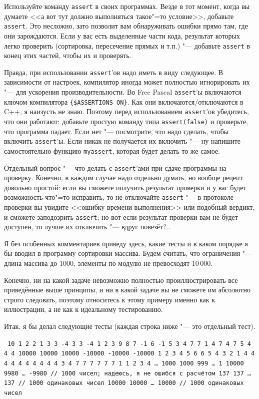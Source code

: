 \documentclass[a4paper,10pt]{problems}
\begin{document}
Используйте команду \verb`assert` в своих программах. 
Везде в тот момент, когда вы думаете <<а вот тут должно выполняться такое"=то условие>>, добавьте \verb`assert`. 
Это несложно, зато позволит вам обнаруживать ошибки прямо там, где они зарождаются. 
Если у вас есть выделенные части кода, результат которых легко проверить (сортировка, пересечение прямых и т.п.) "---
добавьте \verb`assert` в конец этих частей, чтобы их и проверять.

Правда, при использовании \verb`assert`'ов надо иметь в виду следующее.
В зависимости от настроек, компилятор иногда может полностью игнорировать их "--- для ускорения производительности.
Во Free Pascal \verb`assert`'ы включаются ключом компилятора \verb`{$ASSERTIONS ON}`. 
Как они включаются/отключаются в C++, я наизусть не знаю.
Поэтому перед использованием \verb`assert`'ов убедитесь, что они работают: добавьте простую команду типа \verb`assert(false)` и проверьте,
что программа падает. 
Если нет "--- посмотрите, что надо сделать, чтобы включить \verb`assert`'ы. 
Если никак не получается их включить "--- ну напишите самостоятельно функцию \verb`myassert`, которая будет делать то же самое.

Отдельный вопрос "--- что делать с \verb`assert`'ами при сдаче программы на проверку. 
Конечно, в каждом случае надо отдельно думать, но вообще рецепт довольно простой: если вы сможете получить результат проверки и у вас будет возможность
что"=то исправить, то не отключайте \verb`assert` "--- в протоколе проверки вы увидите <<ошибку времени выполнения>> или подобный вердикт, и
сможете заподозрить \verb`assert`; но вот если результат проверки вам не будет доступен, то лучше их отключить "--- вдруг повезёт?..

Я без особенных комментариев приведу здесь, какие тесты и в каком порядке я бы вводил в программу сортировки массива. 
Будем считать, что ограничения "--- длина массива до 1000, элементы по модулю не превосходят $10\,000$.

Конечно, ни на какой задаче невозможно полностью проиллюстрировать все приведённые выше принципы, и ни в какой задаче вы не сможете 
им абсолютно строго следовать, поэтому относитесь к этому примеру именно как к иллюстрации, а не как к идеальному тестированию.

Итак, я бы делал следующие тесты (каждая строка ниже "--- это отдельный тест).

{\noindent\tt{}
10
1 2
2 1
3 3
-4 3
3 -4
1 2 3
9 8 7
-1 6 -1
5 3 4
7 7 1
4 7 4 7
5 4 4 4
10000 10000 10000 -10000 -10000 -10000
1 2 3 4 5 6
6 5 4 3 2 1
4 4 4 4 4 4
4 4 4 4 3 4
7 7 7 7 7 7 1
1 2 3 4 \dots{} 1000
1000 999 \dots{} 1
10000 9980 \dots{} -9980 // 1000 чисел; надеюсь, я не ошибся с расчётом
137 137 \dots{} 137 // 1000 одинаковых чисел
10000 10000 \dots{} 10000 // 1000 одинаковых чисел 
}
\end{document}
